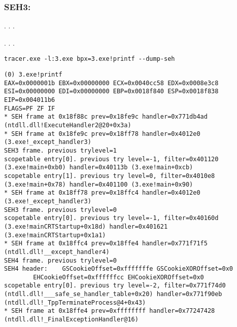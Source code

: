 \subsubsection{SEH3: }



.
  
.
 .



 \printf{} .
.
  
.

\begin{lstlisting}
tracer.exe -l:3.exe bpx=3.exe!printf --dump-seh
\end{lstlisting}

\begin{lstlisting}[caption=tracer.exe output]
(0) 3.exe!printf
EAX=0x0000001b EBX=0x00000000 ECX=0x0040cc58 EDX=0x0008e3c8
ESI=0x00000000 EDI=0x00000000 EBP=0x0018f840 ESP=0x0018f838
EIP=0x004011b6
FLAGS=PF ZF IF
* SEH frame at 0x18f88c prev=0x18fe9c handler=0x771db4ad (ntdll.dll!ExecuteHandler2@20+0x3a)
* SEH frame at 0x18fe9c prev=0x18ff78 handler=0x4012e0 (3.exe!_except_handler3)
SEH3 frame. previous trylevel=1
scopetable entry[0]. previous try level=-1, filter=0x401120 (3.exe!main+0xb0) handler=0x40113b (3.exe!main+0xcb)
scopetable entry[1]. previous try level=0, filter=0x4010e8 (3.exe!main+0x78) handler=0x401100 (3.exe!main+0x90)
* SEH frame at 0x18ff78 prev=0x18ffc4 handler=0x4012e0 (3.exe!_except_handler3)
SEH3 frame. previous trylevel=0
scopetable entry[0]. previous try level=-1, filter=0x40160d (3.exe!mainCRTStartup+0x18d) handler=0x401621 (3.exe!mainCRTStartup+0x1a1)
* SEH frame at 0x18ffc4 prev=0x18ffe4 handler=0x771f71f5 (ntdll.dll!__except_handler4)
SEH4 frame. previous trylevel=0
SEH4 header:	GSCookieOffset=0xfffffffe GSCookieXOROffset=0x0
		EHCookieOffset=0xffffffcc EHCookieXOROffset=0x0
scopetable entry[0]. previous try level=-2, filter=0x771f74d0 (ntdll.dll!___safe_se_handler_table+0x20) handler=0x771f90eb (ntdll.dll!_TppTerminateProcess@4+0x43)
* SEH frame at 0x18ffe4 prev=0xffffffff handler=0x77247428 (ntdll.dll!_FinalExceptionHandler@16)
\end{lstlisting}

